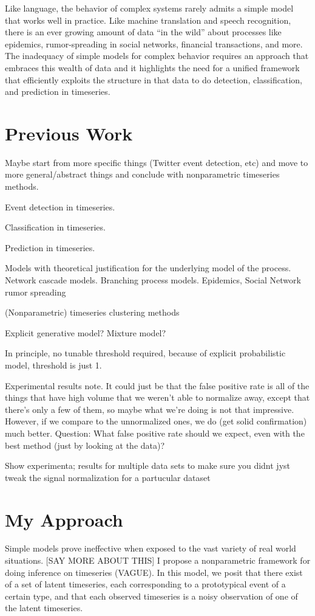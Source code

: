 Like language, the behavior of complex systems rarely admits a simple model that
works well in practice. Like machine translation and speech recognition, there
is an ever growing amount of data ``in the wild'' about processes like
epidemics, rumor-spreading in social networks, financial transactions, and
more. The inadequacy of simple models for complex behavior requires an approach
that embraces this wealth of data and it highlights the need for a unified
framework that efficiently exploits the structure in that data to do detection,
classification, and prediction in timeseries.

\section{Previous Work}
Maybe start from more specific things (Twitter event detection, etc) and move to
more general/abstract things and conclude with nonparametric timeseries methods.

Event detection in timeseries.

Classification in timeseries.

Prediction in timeseries.

Models with theoretical justification for the underlying model of the
process. Network cascade models. Branching process models.  Epidemics, Social
Network rumor spreading

(Nonparametric) timeseries clustering methods

Explicit generative model? Mixture model?

In principle, no tunable threshold required, because of explicit probabilistic
model, threshold is just 1.

Experimental results note. It could just be that the false positive rate is all
of the things that have high volume that we weren't able to normalize away,
except that there's only a few of them, so maybe what we're doing is not that
impressive. However, if we compare to the unnormalized ones, we do (get solid
confirmation) much better. Question: What false positive rate should we expect,
even with the best method (just by looking at the data)?


Show experimenta; results for multiple data sets to make sure you didnt jyst
tweak the signal normalization for a partucular dataset

\section{My Approach}
Simple models prove ineffective when exposed to the vast variety of real world
situations. [SAY MORE ABOUT THIS] I propose a nonparametric framework for doing
inference on timeseries (VAGUE). In this model, we posit that there exist of a
set of latent timeseries, each corresponding to a prototypical event of a
certain type, and that each observed timeseries is a noisy observation of one of
the latent timeseries.

